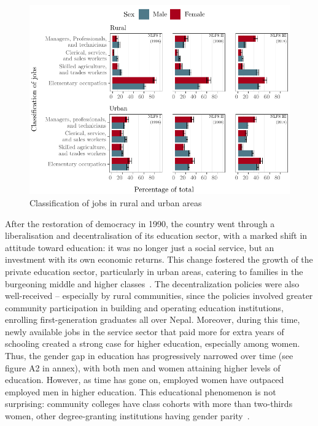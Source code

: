 \begin{figure}[htb!]
	\centering
	\includegraphics{./figure/occupationUrbRur_bar_all_all}
	\caption{Classification of jobs in rural and urban areas}
	\label{fig:occupationUrbRur}
\end{figure}

After the restoration of democracy in 1990, the country went through a liberalisation and decentralisation of its education sector, with a marked shift in attitude toward education: it was no longer just a social service, but an investment with its own economic returns. This change fostered the growth of the private education sector, particularly in urban areas, catering to families in the burgeoning middle and higher classes~\citep{Carney2009}. The decentralization policies were also well-received -- especially by rural communities, since the policies involved greater community participation in building and operating education institutions, enrolling first-generation graduates all over Nepal. Moreover, during this time, newly available jobs in the service sector that paid more for extra years of schooling created a strong case for higher education, especially among women. Thus, the gender gap in education has progressively narrowed over time (see figure A2 in annex), with both men and women attaining higher levels of education. However, as time has gone on, employed women have outpaced employed men in higher education. This educational phenomenon is not surprising: community colleges have class cohorts with more than two-thirds women, other degree-granting institutions having gender parity~\citep{Ugc2022}.\par 

